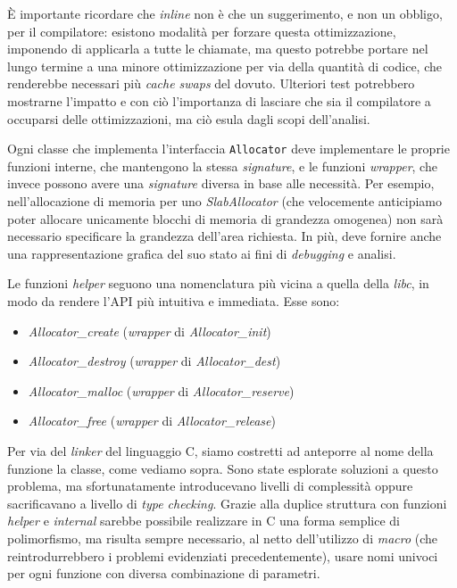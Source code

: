 È importante ricordare che \textit{inline} non è che un suggerimento, e non un obbligo, per il compilatore: esistono modalità per forzare questa ottimizzazione, imponendo di applicarla a tutte le chiamate, ma questo potrebbe portare nel lungo termine a una minore ottimizzazione per via della quantità di codice, che renderebbe necessari più \textit{cache swaps} del dovuto. Ulteriori test potrebbero mostrarne l’impatto e con ciò l’importanza di lasciare che sia il compilatore a occuparsi delle ottimizzazioni, ma ciò esula dagli scopi dell’analisi.

Ogni classe che implementa l’interfaccia \texttt{Allocator} deve implementare le proprie funzioni interne, che mantengono la stessa \textit{signature}, e le funzioni \textit{wrapper}, che invece possono avere una \textit{signature} diversa in base alle necessità. Per esempio, nell’allocazione di memoria per uno \textit{SlabAllocator} (che velocemente anticipiamo poter allocare unicamente blocchi di memoria di grandezza omogenea) non sarà necessario specificare la grandezza dell’area richiesta. In più, deve fornire anche una rappresentazione grafica del suo stato ai fini di \textit{debugging} e analisi.

Le funzioni \textit{helper} seguono una nomenclatura più vicina a quella della \textit{libc}, in modo da rendere l’API più intuitiva e immediata. Esse sono:
\begin{itemize}
  \item \textit{Allocator\_create} (\textit{wrapper} di \textit{Allocator\_init})
  \item \textit{Allocator\_destroy} (\textit{wrapper} di \textit{Allocator\_dest})
  \item \textit{Allocator\_malloc} (\textit{wrapper} di \textit{Allocator\_reserve})
  \item \textit{Allocator\_free} (\textit{wrapper} di \textit{Allocator\_release})
\end{itemize}

Per via del \textit{linker} del linguaggio C, siamo costretti ad anteporre al nome della funzione la classe, come vediamo sopra. Sono state esplorate soluzioni a questo problema, ma sfortunatamente introducevano livelli di complessità oppure sacrificavano a livello di \textit{type checking}. Grazie alla duplice struttura con funzioni \textit{helper} e \textit{internal} sarebbe possibile realizzare in C una forma semplice di polimorfismo, ma risulta sempre necessario, al netto dell’utilizzo di \textit{macro} (che reintrodurrebbero i problemi evidenziati precedentemente), usare nomi univoci per ogni funzione con diversa combinazione di parametri.
